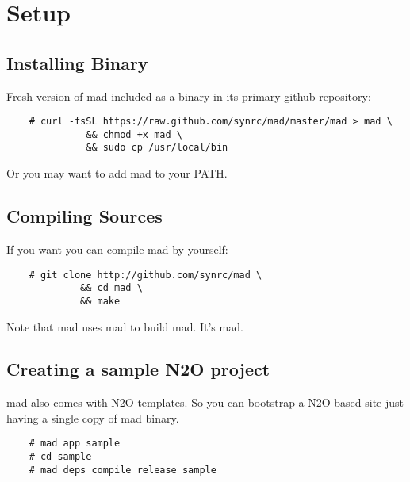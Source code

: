 \section{Setup}

\subsection{Installing Binary}

Fresh version of mad included as a binary in its primary github repository:

\vspace{1\baselineskip}
\begin{lstlisting}
    # curl -fsSL https://raw.github.com/synrc/mad/master/mad > mad \
              && chmod +x mad \
              && sudo cp /usr/local/bin
\end{lstlisting}
\vspace{1\baselineskip}

Or you may want to add mad to your PATH.

\subsection{Compiling Sources}

If you want you can compile mad by yourself:

\vspace{1\baselineskip}
\begin{lstlisting}
    # git clone http://github.com/synrc/mad \
             && cd mad \
             && make
\end{lstlisting}
\vspace{1\baselineskip}

Note that mad uses mad to build mad. It's mad.

\subsection{Creating a sample N2O project}

mad also comes with N2O templates. So you can bootstrap a N2O-based site
just having a single copy of mad binary.

\vspace{1\baselineskip}
\begin{lstlisting}
    # mad app sample
    # cd sample
    # mad deps compile release sample
\end{lstlisting}
\vspace{1\baselineskip}

